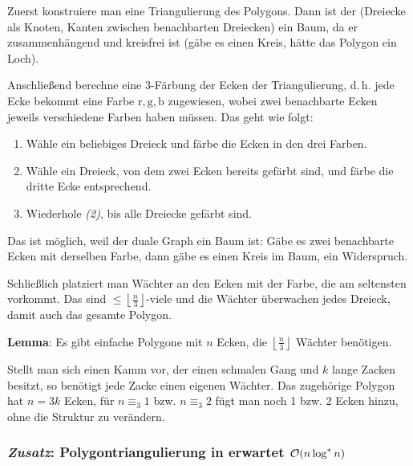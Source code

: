 \begin{Beweis}
    Zuerst konstruiere man eine Triangulierung des Polygons.
    Dann ist der 
    (Dreiecke als Knoten, Kanten zwischen benachbarten Dreiecken) ein Baum,
    da er zusammenhängend und kreisfrei ist
    (gäbe es einen Kreis, hätte das Polygon ein Loch).

    Anschließend berechne eine $3$-Färbung der Ecken der Triangulierung,
    d.\,h. jede Ecke bekommt eine Farbe $\text{r}, \text{g}, \text{b}$ zugewiesen,
    wobei zwei benachbarte Ecken jeweils verschiedene Farben haben müssen.
    Das geht wie folgt:
    \begin{enumerate}
        \item
        Wähle ein beliebiges Dreieck und färbe die Ecken in den drei Farben.

        \item
        Wähle ein Dreieck, von dem zwei Ecken bereits gefärbt sind, und färbe die dritte Ecke
        entsprechend.

        \item
        Wiederhole \emph{(2)}, bis alle Dreiecke gefärbt sind.
    \end{enumerate}
    Das ist möglich, weil der duale Graph ein Baum ist:
    Gäbe es zwei benachbarte Ecken mit derselben Farbe, dann gäbe es einen Kreis im Baum,
    ein Widerspruch.

    Schließlich platziert man Wächter an den Ecken mit der Farbe, die am seltensten vorkommt.
    Das sind $\le \left\lfloor \frac{n}{3} \right\rfloor$-viele und die Wächter überwachen
    jedes Dreieck, damit auch das gesamte Polygon.
\end{Beweis}

\textbf{Lemma}:
Es gibt einfache Polygone mit $n$ Ecken,
die $\left\lfloor \frac{n}{3} \right\rfloor$ Wächter benötigen.

\begin{Beweis}
    Stellt man sich einen Kamm vor, der einen schmalen Gang und $k$ lange Zacken besitzt,
    so benötigt jede Zacke einen eigenen Wächter.
    Das zugehörige Polygon hat $n = 3k$ Ecken, für $n \equiv_3 1$ bzw. $n \equiv_3 2$
    fügt man noch 1 bzw. 2 Ecken hinzu, ohne die Struktur zu verändern.
\end{Beweis}

\pagebreak

\subsubsection{%
    \emph{Zusatz}: Polygontriangulierung in erwartet
    \texorpdfstring{$\mathcal{O}(n\log^\ast n)$}{O(n log* n)}%
}

